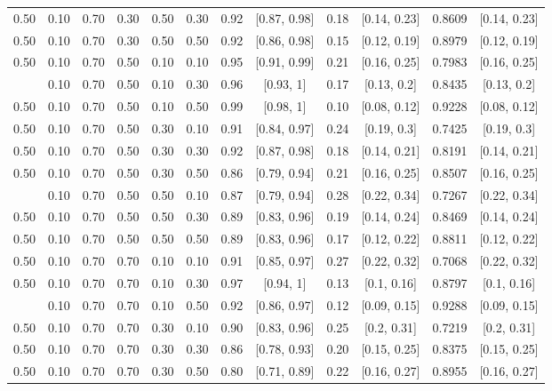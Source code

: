 \documentclass[
  11pt,
]{article}
\begin{document}
\begin{landscape}
\begin{ThreePartTable}
\begin{longtable}[t]{cccccccccccc}
0.50 & 0.10 & 0.70 & 0.30 & 0.50 & 0.30 & 0.92 & {}[0.87, 0.98] & 0.18 & {}[0.14, 0.23] & 0.8609 & {}[0.14, 0.23]\\
0.50 & 0.10 & 0.70 & 0.30 & 0.50 & 0.50 & 0.92 & {}[0.86, 0.98] & 0.15 & {}[0.12, 0.19] & 0.8979 & {}[0.12, 0.19]\\
0.50 & 0.10 & 0.70 & 0.50 & 0.10 & 0.10 & 0.95 & {}[0.91, 0.99] & 0.21 & {}[0.16, 0.25] & 0.7983 & {}[0.16, 0.25]\\
\addlinespace
0.50 & 0.10 & 0.70 & 0.50 & 0.10 & 0.30 & 0.96 & {}[0.93, 1] & 0.17 & {}[0.13, 0.2] & 0.8435 & {}[0.13, 0.2]\\
0.50 & 0.10 & 0.70 & 0.50 & 0.10 & 0.50 & 0.99 & {}[0.98, 1] & 0.10 & {}[0.08, 0.12] & 0.9228 & {}[0.08, 0.12]\\
0.50 & 0.10 & 0.70 & 0.50 & 0.30 & 0.10 & 0.91 & {}[0.84, 0.97] & 0.24 & {}[0.19, 0.3] & 0.7425 & {}[0.19, 0.3]\\
0.50 & 0.10 & 0.70 & 0.50 & 0.30 & 0.30 & 0.92 & {}[0.87, 0.98] & 0.18 & {}[0.14, 0.21] & 0.8191 & {}[0.14, 0.21]\\
0.50 & 0.10 & 0.70 & 0.50 & 0.30 & 0.50 & 0.86 & {}[0.79, 0.94] & 0.21 & {}[0.16, 0.25] & 0.8507 & {}[0.16, 0.25]\\
\addlinespace
0.50 & 0.10 & 0.70 & 0.50 & 0.50 & 0.10 & 0.87 & {}[0.79, 0.94] & 0.28 & {}[0.22, 0.34] & 0.7267 & {}[0.22, 0.34]\\
0.50 & 0.10 & 0.70 & 0.50 & 0.50 & 0.30 & 0.89 & {}[0.83, 0.96] & 0.19 & {}[0.14, 0.24] & 0.8469 & {}[0.14, 0.24]\\
0.50 & 0.10 & 0.70 & 0.50 & 0.50 & 0.50 & 0.89 & {}[0.83, 0.96] & 0.17 & {}[0.12, 0.22] & 0.8811 & {}[0.12, 0.22]\\
0.50 & 0.10 & 0.70 & 0.70 & 0.10 & 0.10 & 0.91 & {}[0.85, 0.97] & 0.27 & {}[0.22, 0.32] & 0.7068 & {}[0.22, 0.32]\\
0.50 & 0.10 & 0.70 & 0.70 & 0.10 & 0.30 & 0.97 & {}[0.94, 1] & 0.13 & {}[0.1, 0.16] & 0.8797 & {}[0.1, 0.16]\\
\addlinespace
0.50 & 0.10 & 0.70 & 0.70 & 0.10 & 0.50 & 0.92 & {}[0.86, 0.97] & 0.12 & {}[0.09, 0.15] & 0.9288 & {}[0.09, 0.15]\\
0.50 & 0.10 & 0.70 & 0.70 & 0.30 & 0.10 & 0.90 & {}[0.83, 0.96] & 0.25 & {}[0.2, 0.31] & 0.7219 & {}[0.2, 0.31]\\
0.50 & 0.10 & 0.70 & 0.70 & 0.30 & 0.30 & 0.86 & {}[0.78, 0.93] & 0.20 & {}[0.15, 0.25] & 0.8375 & {}[0.15, 0.25]\\
0.50 & 0.10 & 0.70 & 0.70 & 0.30 & 0.50 & 0.80 & {}[0.71, 0.89] & 0.22 & {}[0.16, 0.27] & 0.8955 & {}[0.16, 0.27]\\

\end{longtable}
\end{ThreePartTable}
\end{landscape}
\end{document}
